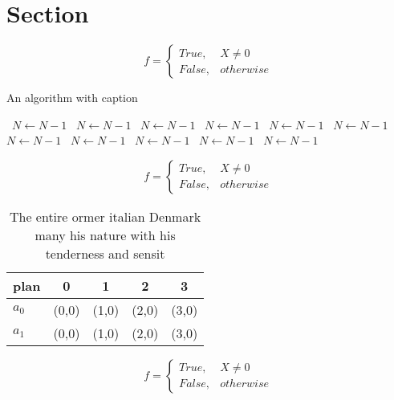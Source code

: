 \documentclass[a4paper]{article}
\begin{document}
\section{Section}

\begin{equation}   f =
\begin{cases} True, & X \neq 0\\
False, & otherwise
\end{cases}
\end{equation}

\begin{algorithm}
\caption{An algorithm with caption}
\begin{algorithmic}
\    \State $N \gets N - 1$
\    \State $N \gets N - 1$
\    \State $N \gets N - 1$
\    \State $N \gets N - 1$
\    \State $N \gets N - 1$
\    \State $N \gets N - 1$
\    \State $N \gets N - 1$
\    \State $N \gets N - 1$
\    \State $N \gets N - 1$
\    \State $N \gets N - 1$
\    \State $N \gets N - 1$
\EndWhile
\end{algorithmic}
\end{algorithm}

\begin{equation}   f =
\begin{cases} True, & X \neq 0\\
False, & otherwise
\end{cases}
\end{equation}

\begin{table}
\begin{adjustbox}{width=0.5\columnwidth}
\begin{tabular}{|l|l|l|l|l|}
\hline
\textbf{plan} & \multicolumn{1}{c|}{\textbf{0}} & \multicolumn{1}{c|}{\textbf{1}} & \multicolumn{1}{c|}{\textbf{2}} & \multicolumn{1}{c|}{\textbf{3}} \\ \hline
\textbf{$a_0$}  & (0,0) & (1,0) & (2,0) & (3,0) \\ \hline
\textbf{$a_1$}  & (0,0) & (1,0) & (2,0) & (3,0) \\ \hline
\end{tabular}
\end{adjustbox}
\caption{The entire ormer italian Denmark many his nature with his tenderness and sensit
}
\end{table}

\begin{equation}   f =
\begin{cases} True, & X \neq 0\\
False, & otherwise
\end{cases}
\end{equation}
\end{document}
